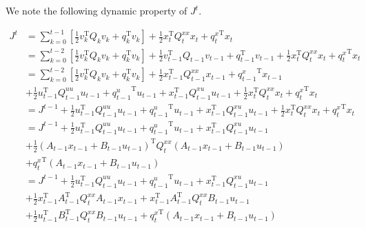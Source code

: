 \documentclass{article}
\begin{document}
We note the following dynamic property of $J^t$.

\begin{align*}
	J^t & = \sum_{k=0}^{t-1} \left[ \frac{1}{2} v_k^\mathrm{T} Q_k v_k + q_k^\mathrm{T} v_k \right] + \frac{1}{2} x_t^\mathrm{T} Q_t^{xx} x_t + {q_t^x}^\mathrm{T} x_t                                                                               \\
	    & = \sum_{k=0}^{t-2} \left[ \frac{1}{2} v_k^\mathrm{T} Q_k v_k + q_k^\mathrm{T} v_k \right] + \frac{1}{2} v_{t-1}^\mathrm{T} Q_{t-1} v_{t-1} + q_{t-1}^\mathrm{T} v_{t-1} + \frac{1}{2} x_t^\mathrm{T} Q_t^{xx} x_t + {q_t^x}^\mathrm{T} x_t \\
	    & = \sum_{k=0}^{t-2} \left[ \frac{1}{2} v_k^\mathrm{T} Q_k v_k + q_k^\mathrm{T} v_k \right] + \frac{1}{2} x_{t-1}^\mathrm{T} Q_{t-1}^{xx} x_{t-1} + {q_{t-1}^x}^\mathrm{T} x_{t-1}                                                           \\
	    & + \frac{1}{2} u_{t-1}^\mathrm{T} Q_{t-1}^{uu} u_{t-1} + {q_{t-1}^u}^\mathrm{T} u_{t-1}  + x_{t-1}^\mathrm{T} Q_{t-1}^{xu} u_{t-1} + \frac{1}{2} x_t^\mathrm{T} Q_t^{xx} x_t + {q_t^x}^\mathrm{T} x_t                                       \\
	    & = J^{t-1} + \frac{1}{2} u_{t-1}^\mathrm{T} Q_{t-1}^{uu} u_{t-1} + {q_{t-1}^u}^\mathrm{T} u_{t-1}  + x_{t-1}^\mathrm{T} Q_{t-1}^{xu} u_{t-1} + \frac{1}{2} x_t^\mathrm{T} Q_t^{xx} x_t + {q_t^x}^\mathrm{T} x_t                             \\
	    & = J^{t-1} + \frac{1}{2} u_{t-1}^\mathrm{T} Q_{t-1}^{uu} u_{t-1} + {q_{t-1}^u}^\mathrm{T} u_{t-1}  + x_{t-1}^\mathrm{T} Q_{t-1}^{xu} u_{t-1}                                                                                                \\
	    & + \frac{1}{2} \left( A_{t-1} x_{t-1} + B_{t-1} u_{t-1} \right)^\mathrm{T} Q_t^{xx} \left( A_{t-1} x_{t-1} + B_{t-1} u_{t-1} \right)                                                                                                        \\
	    & + {q_t^x}^\mathrm{T} \left( A_{t-1} x_{t-1} + B_{t-1} u_{t-1} \right)                                                                                                                                                                      \\
	    & = J^{t-1} + \frac{1}{2} u_{t-1}^\mathrm{T} Q_{t-1}^{uu} u_{t-1} + {q_{t-1}^u}^\mathrm{T} u_{t-1}  + x_{t-1}^\mathrm{T} Q_{t-1}^{xu} u_{t-1}                                                                                                \\
	    & + \frac{1}{2} x_{t-1}^\mathrm{T} A_{t-1}^\mathrm{T} Q_t^{xx} A_{t-1} x_{t-1} + x_{t-1}^\mathrm{T} A_{t-1}^\mathrm{T} Q_t^{xx} B_{t-1} u_{t-1}                                                                                              \\
	    & + \frac{1}{2} u_{t-1}^\mathrm{T} B_{t-1}^\mathrm{T} Q_t^{xx} B_{t-1} u_{t-1} + {q_t^x}^\mathrm{T} \left( A_{t-1} x_{t-1} + B_{t-1} u_{t-1} \right)                                                                                         \\
\end{align*}
\end{document}

